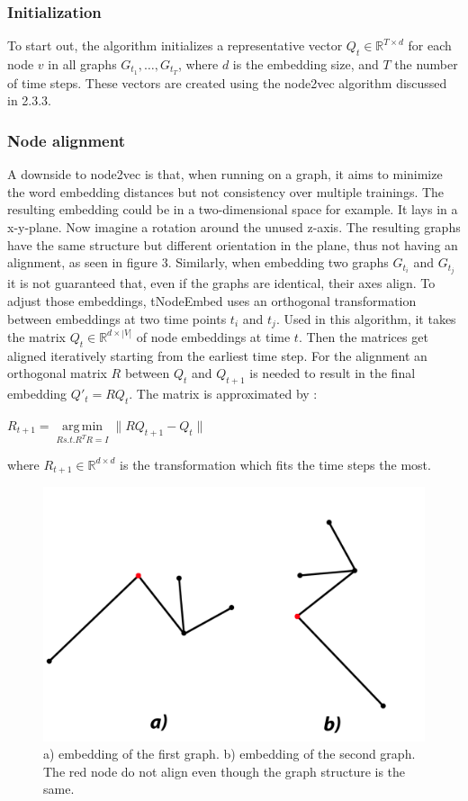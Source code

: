 \documentclass[sigconf]{acmart}
\DeclareMathOperator*{\argmin}{arg\,min}
\begin{document}
\subsubsection{Initialization}
To start out, the algorithm initializes a representative vector \(Q_t \in \mathbb{R}^{T \times d}\) for each node \(v\) in all graphs \(G_{t_1}, \ldots, G_{t_T} \), where \(d\) is the embedding size, and \(T\) the number of time steps.
These vectors are created using the node2vec algorithm discussed in 2.3.3.

\subsubsection{Node alignment}
A downside to node2vec is that, when running on a graph, it aims to minimize the word embedding distances but not consistency over multiple trainings.
The resulting embedding could be in a two-dimensional space for example. It lays in a x-y-plane. Now imagine a rotation around the unused z-axis. The resulting graphs have the
same structure but different orientation in the plane, thus not having an alignment, as seen in figure 3.
Similarly, when embedding two graphs \(G_{t_i}\) and \(G_{t_j}\) it is not guaranteed that, even if the graphs are identical, their axes align.
To adjust those embeddings, tNodeEmbed uses an orthogonal transformation between embeddings at two time points \(t_i\) and \(t_j\)\cite{Schonemann.1966}.
Used in this algorithm, it takes the matrix \(Q_t \in \mathbb{R}^{d\times |V|}\) of node embeddings at time \(t\). Then the matrices get aligned iteratively starting from the earliest time step.
For the alignment an orthogonal matrix \(R\) between \(Q_t\) and \(Q_{t+1}\) is needed to result in the final embedding \(Q'_t = RQ_t\).
The matrix is approximated by : 
\begin{center}
  \(R_{t+1} = \argmin\limits_{R s.t. R^TR =I} \|RQ_{t+1} - Q_t\| \)
\end{center}
where \(R_{t+1} \in \mathbb{R}^{d \times d} \) is the transformation which fits the time steps the most.
\begin{figure}[h]
  \includegraphics[scale=0.1]{UnalignedGraphs.png}
  \caption{a) embedding of the first graph. b) embedding of the second graph. The red node do not align even though the graph structure is the same.}
\end{figure}
\end{document}
